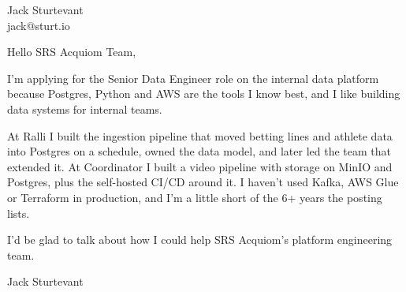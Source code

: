 \documentclass[11pt]{article}
\begin{document}
\raggedright

{\namefont\fontsize{20pt}{24pt}\selectfont Jack Sturtevant}\\[-0.3em]
jack@sturt.io

\vspace{1.2em}

Hello SRS Acquiom Team,

I'm applying for the Senior Data Engineer role on the internal data platform because Postgres, Python and AWS are the tools I know best, and I like building data systems for internal teams.

At Ralli I built the ingestion pipeline that moved betting lines and athlete data into Postgres on a schedule, owned the data model, and later led the team that extended it. At Coordinator I built a video pipeline with storage on MinIO and Postgres, plus the self-hosted CI/CD around it. I haven't used Kafka, AWS Glue or Terraform in production, and I'm a little short of the 6+ years the posting lists.

I'd be glad to talk about how I could help SRS Acquiom's platform engineering team.

\vspace{0.6em}
Jack Sturtevant
\end{document}
